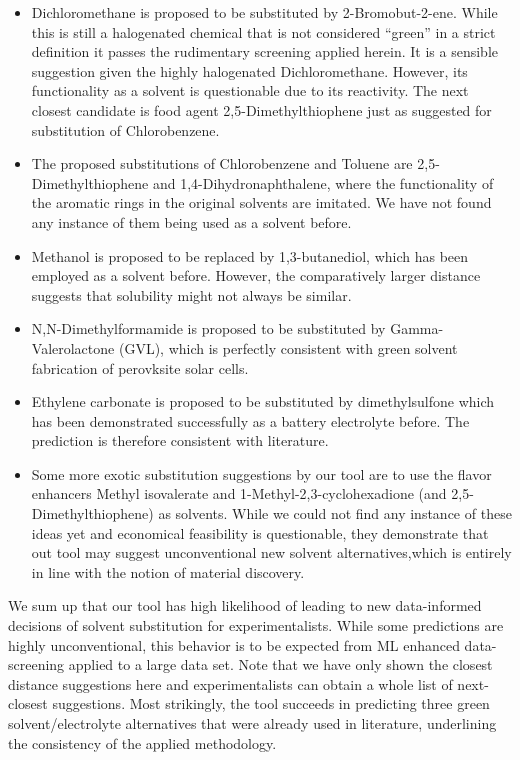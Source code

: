 \documentclass[
  english,        %
  font=times,     %
  onecolumn,      %
]{article}
\begin{document}
\begin{itemize}
    \item Dichloromethane is proposed to be substituted by 2-Bromobut-2-ene. While this is still a halogenated chemical that is not considered ``green'' in a strict definition it passes the rudimentary screening applied herein. It is a sensible suggestion given the highly halogenated Dichloromethane.  However, its functionality as a solvent is questionable due to its reactivity\cite{orkinPhotochemistryBromineContainingFluorinated2002}.  The next closest candidate is food agent  2,5-Dimethylthiophene just as suggested for substitution of Chlorobenzene.
    \item The proposed substitutions of Chlorobenzene and Toluene are 2,5-Dimethylthiophene and 1,4-Dihydronaphthalene, where the functionality of the aromatic rings in the original solvents are imitated. We have not found any instance of them being used as a solvent before.
    \item Methanol is proposed to be replaced by 1,3-butanediol, which has been employed as a solvent before\cite{romeroFeasibility13butanediolSolvent2010}. However, the comparatively larger distance suggests that solubility might not always be similar.
    \item N,N-Dimethylformamide is proposed to be substituted by Gamma-Valerolactone (GVL), which is perfectly consistent with green solvent fabrication of perovksite solar cells\cite{hanGreenSolutionProcessing2024,kimEcoFriendlyAllLayerGreen2024,baeAdvancingPerovskiteSolar2025}.
    \item Ethylene carbonate is proposed to be substituted by dimethylsulfone which has been demonstrated successfully as a battery electrolyte before\cite{hofmannNovelElectrolyteMixtures2015}. The prediction is therefore consistent with literature.
    \item Some more exotic substitution suggestions by our tool are to use the flavor enhancers Methyl isovalerate and 1-Methyl-2,3-cyclohexadione (and 2,5-Dimethylthiophene) as solvents. While we could not find any instance of these ideas yet and economical feasibility is questionable, they demonstrate that out tool may suggest unconventional new solvent alternatives,which is entirely in line with the notion of material discovery.
\end{itemize}

We sum up that our tool has high likelihood of leading to new data-informed decisions of solvent substitution for experimentalists. While some predictions are highly unconventional, this behavior is to be expected from  ML enhanced data-screening applied to a large data set. Note that we have only shown the closest distance suggestions here and experimentalists can obtain a whole list of next-closest suggestions. Most strikingly, the tool succeeds in predicting three green solvent/electrolyte alternatives that were already used in literature, underlining the consistency of the applied methodology.
\end{document}
